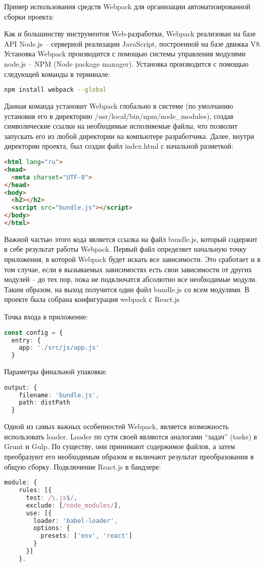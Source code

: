 Пример использования средств Webpack для организации автоматизированной сборки проекта:

Как и большинству инструментов Web-разработки, Webpack реализован на базе API Node.js \cite{wamp}\cite{node} -- серверной реализации JavaScript, построенной на базе движка V8. Установка Webpack производится с помощью
системы управления модулями node.js -- NPM \cite{npm} (Node package manager). Установка производится с помощью следующей команды в терминале:

\begin{lstlisting}[language=bash, label=lst:domain:html]
npm install webpack --global
\end{lstlisting}

Данная команда установит Webpack глобально в системе (по умолчанию установив его в директорию /usr/local/bin/npm/node\_modules), создав символические ссылки на необходимые исполняемые файлы, что
позволит запускать его из любой директории на компьютере разработчика. Далее, внутри директории проекта, был создан файл index.html с начальной разметкой:

\begin{lstlisting}[language=HTML, label=lst:domain:html]
<html lang="ru">
<head>
  <meta charset="UTF-8">
</head>
<body>
  <h2></h2>
  <script src="bundle.js"></script>
</body>
</html>
\end{lstlisting}

Важной частью этого кода является ссылка на файл bundle.js, который содержит в себе результат работы Webpack.
Первый файл определяет начальную точку приложения, в которой Webpack будет искать все зависимости. Это сработает и в том случае, если в вызываемых зависимостях 
есть свои зависимости от других модулей -- до тех пор, пока не подключатся абсолютно все необходимые модули. Таким образом, на выход получится один файл bundle.js со всем модулями.
В проекте была собрана конфигурация webpack с React.js

Точка входа в приложение:
\begin{lstlisting}[language=TypeScript, label=lst:domain:html]
const config = {
  entry: {
    app: './src/js/app.js'
  }
\end{lstlisting}

Параметры финальной упаковки:
\begin{lstlisting}[language=TypeScript, label=lst:domain:html]
  output: {
    filename: 'bundle.js',
    path: distPath
  }
\end{lstlisting}

Одной из самых важных особенностей Webpack, является возможность использовать loader. Loader по сути своей являются аналогами “задач” (tasks) в Grunt и Gulp. По существу,
они принимают содержимое файлов, а затем преобразуют его необходимым образом и включают результат преобразования в общую сборку.
Подключение React.js в бандлере:
\begin{lstlisting}[language=TypeScript, label=lst:domain:html]
 module: {
    rules: [{
      test: /\.js$/,
      exclude: [/node_modules/],
      use: [{
        loader: 'babel-loader',
        options: {
          presets: ['env', 'react']
        }
      }]
    }.
\end{lstlisting}

